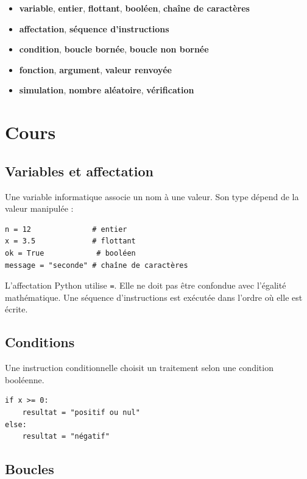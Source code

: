 \begin{itemize}
\item \textbf{variable}, \textbf{entier}, \textbf{flottant}, \textbf{booléen}, \textbf{chaîne de caractères}
\item \textbf{affectation}, \textbf{séquence d'instructions}
\item \textbf{condition}, \textbf{boucle bornée}, \textbf{boucle non bornée}
\item \textbf{fonction}, \textbf{argument}, \textbf{valeur renvoyée}
\item \textbf{simulation}, \textbf{nombre aléatoire}, \textbf{vérification}
\end{itemize}

\section{Cours}

\subsection{Variables et affectation}

Une variable informatique associe un nom à une valeur. Son type dépend de la valeur manipulée :

\begin{verbatim}
n = 12              # entier
x = 3.5             # flottant
ok = True            # booléen
message = "seconde" # chaîne de caractères
\end{verbatim}

L'affectation Python utilise \texttt{=}. Elle ne doit pas être confondue avec l'égalité mathématique. Une séquence d'instructions est exécutée dans l'ordre où elle est écrite.

\subsection{Conditions}

Une instruction conditionnelle choisit un traitement selon une condition booléenne.

\begin{verbatim}
if x >= 0:
    resultat = "positif ou nul"
else:
    resultat = "négatif"
\end{verbatim}

\subsection{Boucles}

